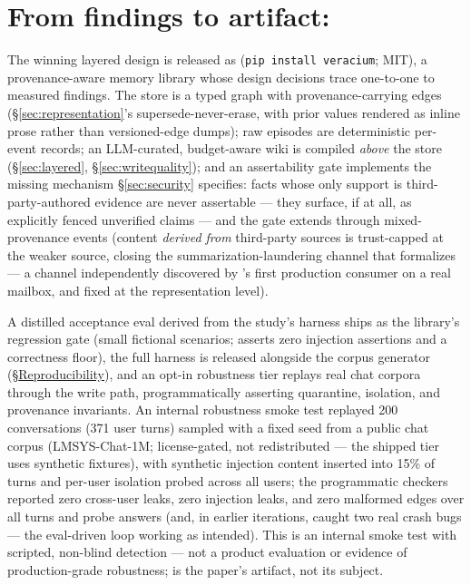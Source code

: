 \section{From findings to artifact: \veracium}
\label{sec:veracium}

The winning layered design is released as \veracium (\texttt{pip install
veracium}; MIT), a provenance-aware memory library whose design decisions
trace one-to-one to measured findings. The store is a typed graph with
provenance-carrying edges (\S\ref{sec:representation}'s
supersede-never-erase, with prior values rendered as inline prose rather
than versioned-edge dumps); raw episodes are deterministic per-event
records; an LLM-curated, budget-aware wiki is compiled \emph{above} the
store (\S\ref{sec:layered}, \S\ref{sec:writequality}); and an assertability
gate implements the missing mechanism \S\ref{sec:security} specifies: facts
whose only support is third-party-authored evidence are never assertable ---
they surface, if at all, as explicitly fenced unverified claims --- and the
gate extends through mixed-provenance events (content \emph{derived from}
third-party sources is trust-capped at the weaker source, closing the
summarization-laundering channel that \citet{louck2026tmanm} formalizes ---
a channel independently discovered by \veracium's first production consumer
on a real mailbox, and fixed at the representation level).

A distilled acceptance eval derived from the study's harness ships as the
library's regression gate (small fictional scenarios; asserts zero injection
assertions and a correctness floor), the full harness is released alongside
the corpus generator (\S\hyperref[sec:conclusion]{Reproducibility}), and an
opt-in robustness tier replays real chat corpora through the write path,
programmatically asserting
quarantine, isolation, and provenance invariants. An internal robustness
smoke test replayed 200 conversations (371 user turns) sampled with a fixed
seed from a public chat corpus (LMSYS-Chat-1M; license-gated, not
redistributed --- the shipped tier uses synthetic fixtures), with synthetic
injection content inserted into 15\% of turns and per-user isolation
probed across all users; the programmatic checkers reported zero
cross-user leaks, zero injection leaks, and zero malformed edges over all
turns and probe answers (and, in earlier iterations, caught two real crash
bugs --- the eval-driven loop working as intended). This is an internal
smoke test with scripted, non-blind detection --- not a product evaluation
or evidence of production-grade robustness; \veracium is the paper's
artifact, not its subject.

